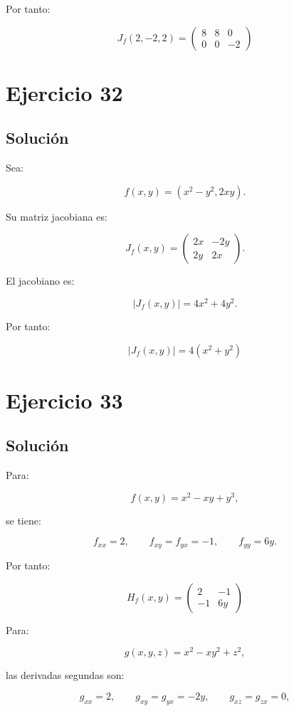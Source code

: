 \documentclass[11pt,a4paper]{article}
\begin{document}
Por tanto:

\[
\boxed{
J_f(2,-2,2)
=
\begin{pmatrix}
8&8&0\\
0&0&-2
\end{pmatrix}
}
\]

\section{Ejercicio 32}
\subsection{Solución}

Sea:

\[
f(x,y)
=
(x^2-y^2,2xy).
\]

Su matriz jacobiana es:

\[
J_f(x,y)
=
\begin{pmatrix}
2x&-2y\\
2y&2x
\end{pmatrix}.
\]

El jacobiano es:

\[
|J_f(x,y)|
=
4x^2+4y^2.
\]

Por tanto:

\[
\boxed{
|J_f(x,y)|
=
4(x^2+y^2)
}
\]

\section{Ejercicio 33}
\subsection{Solución}

Para:

\[
f(x,y)=x^2-xy+y^3,
\]

se tiene:

\[
f_{xx}=2,
\qquad
f_{xy}=f_{yx}=-1,
\qquad
f_{yy}=6y.
\]

Por tanto:

\[
\boxed{
H_f(x,y)
=
\begin{pmatrix}
2&-1\\
-1&6y
\end{pmatrix}
}
\]

Para:

\[
g(x,y,z)
=
x^2-xy^2+z^2,
\]

las derivadas segundas son:

\[
g_{xx}=2,
\qquad
g_{xy}=g_{yx}=-2y,
\qquad
g_{xz}=g_{zx}=0,
\]
\end{document}

